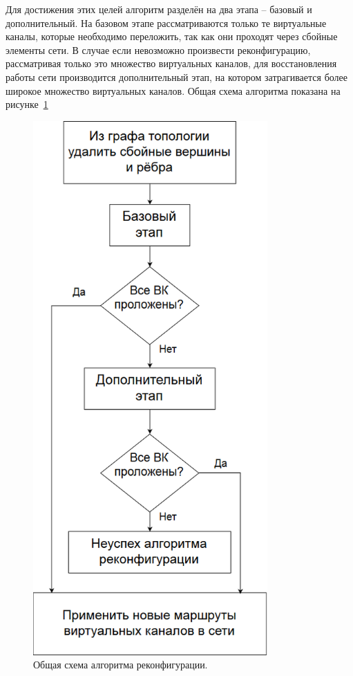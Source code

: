 \documentclass[12pt, a4paper]{article}
\begin{document}
Для достижения этих целей алгоритм разделён на два этапа -- базовый и дополнительный. На базовом этапе рассматриваются только те виртуальные каналы, которые необходимо переложить, так как они проходят через сбойные элементы сети. В случае если невозможно произвести реконфигурацию, рассматривая только это множество виртуальных каналов, для восстановления работы сети производится дополнительный этап, на котором затрагивается более широкое множество виртуальных каналов. Общая схема алгоритма показана на рисунке~\ref{pic:algorithm}

\begin{figure}[h!]
	\centering
	\includegraphics[width=0.80\textwidth]{img/alg.png}
	\caption{Общая схема алгоритма реконфигурации.}
	\label{pic:algorithm}
\end{figure}
\end{document}
